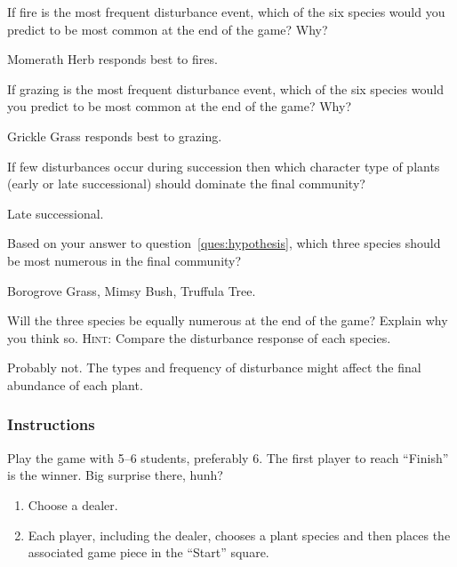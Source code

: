 \documentclass[12pt, hidelinks]{exam}
\newcommand*\AnswerBox[2]{%
    \parbox[t][#1]{0.92\textwidth}{%
    \begin{solution}#2\end{solution}}
    \vspace{\stretch{1}}
}
\newlength{\basespace}
\begin{document}
\begin{questions}

\question
If fire is the most frequent disturbance event, which of the six species would you predict to be most common at the end of the game? Why?

\AnswerBox{0.35\basespace}{Momerath Herb responds best to fires.}

\question
If grazing is the most frequent disturbance event, which of the six species would you predict to be most common at the end of the game?  Why?

\AnswerBox{0.35\basespace}{Grickle Grass responds best to grazing.}

\question \label{ques:hypothesis}
If few disturbances occur during succession then which character type of plants (early or late successional) should dominate the final community?

\AnswerBox{0.35\basespace}{Late successional.}

\question
Based on your answer to question~\ref{ques:hypothesis}, which three species should be most numerous in the final community? 

\AnswerBox{0.35\basespace}{Borogrove Grass, Mimsy Bush, Truffula Tree.}

\begin{samepage}

\question
Will the three species be equally numerous at the end of the game? Explain why you think so.
\textsc{Hint:} Compare the disturbance response of each species. 

\AnswerBox{0.35\basespace}{Probably not. The types and frequency of disturbance might affect the
	final abundance of each plant.}

	
\subsubsection*{Instructions}

Play the game with 5–6 students, preferably 6. The first player 
to reach “Finish” is the winner. Big surprise there, hunh?

\end{samepage}

\begin{enumerate}
	
	\item Choose a dealer. 
	
	\item Each player, including the dealer, chooses a plant species and then
	places the associated game piece in the “Start” square.
	

\end{enumerate}
\end{questions}
\end{document}
